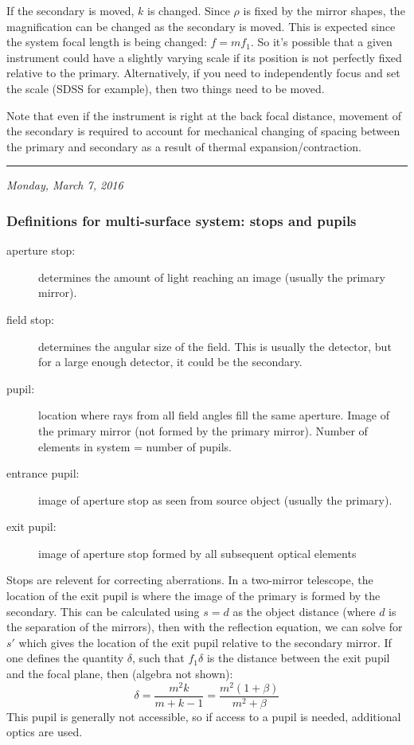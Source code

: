 \documentclass[12pt]{article}
\newcommand{\mydate}[1]{
    \begin{flushright}
        \rule{\textwidth}{0.4pt} %
        \footnotesize\hfill\textit{#1}
    \end{flushright}}
\begin{document}
If the secondary is moved, $k$ is changed. Since $\rho$ is fixed by the mirror
shapes, the magnification can be changed as the secondary is moved. This is
expected since the system focal length is being changed: $f = mf_{1}$. So it's
possible that a given instrument could have a slightly varying scale if its
position is not perfectly fixed relative to the primary. Alternatively, if you
need to independently focus and set the scale (SDSS for example), then two
things need to be moved.

Note that even if the instrument is right at the back focal distance, movement
of the secondary is required to account for mechanical changing of spacing
between the primary and secondary as a result of thermal expansion/contraction.

\mydate{Monday, March 7, 2016}
\subsubsection{Definitions for multi-surface system: stops and pupils}
\begin{description}
    \item [aperture stop:] determines the amount of light reaching an
        image (usually the primary mirror).
    \item [field stop:] determines the angular size of the field. This
        is usually the detector, but for a large enough detector, it
        could be the secondary.
    \item [pupil:] location where rays from all field angles fill the
        same aperture. Image of the primary mirror (not formed by
        the primary mirror). Number of elements in system = number
        of pupils.
    \item [entrance pupil:] image of aperture stop as seen from source
        object (usually the primary).
    \item [exit pupil:] image of aperture stop formed by all subsequent
        optical elements
\end{description}
Stops are relevent for correcting aberrations.
In a two-mirror telescope, the location of the exit pupil is where the
image of the primary is formed by the secondary. This can be calculated
using $s=d$ as the object distance (where $d$ is the separation of the
mirrors), then with the reflection equation, we can solve for $s'$
which gives the location of the exit pupil relative to the secondary
mirror. If one defines the quantity $\delta$, such that $f_{1}\delta$
is the distance between the exit pupil and the focal plane,
then (algebra not shown):
\[
    \delta = \frac{m^{2}k}{m+k-1} = \frac{m^{2}(1+\beta)}{m^{2}+\beta}
    \]
This pupil is generally not accessible, so if access to a pupil is
needed, additional optics are used.
\end{document}
